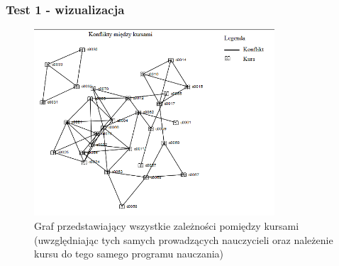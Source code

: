 \subsubsection{Test 1 - wizualizacja}
\begin{figure}[H]
  \caption{Graf przedstawiający wszystkie zależności pomiędzy kursami (uwzględniając tych samych prowadzących nauczycieli oraz należenie kursu do tego samego programu nauczania) }
  \centering
    \includegraphics[width=0.8\textwidth]{test1.PNG}
\end{figure}


